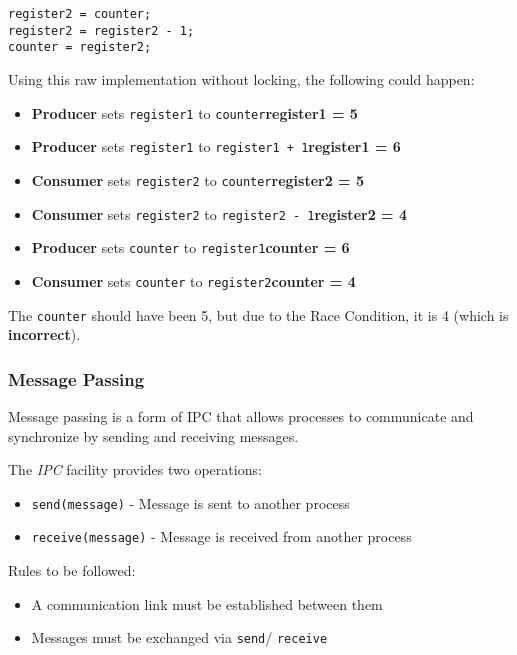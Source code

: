 \documentclass[]{article}
\begin{document}
\begin{tcolorbox}[title = Decrement]
\begin{verbatim}
register2 = counter;
register2 = register2 - 1;
counter = register2;
\end{verbatim}
\end{tcolorbox}

Using this raw implementation without locking, the following could happen:

\begin{itemize}
    \item \textbf{Producer} sets \verb|register1| to \verb|counter|\hfill \textbf{register1 = 5}
    \item \textbf{Producer} sets \verb|register1| to \verb|register1 + 1|\hfill \textbf{register1 = 6}
    \item \textbf{Consumer} sets \verb|register2| to \verb|counter|\hfill \textbf{register2 = 5}
    \item \textbf{Consumer} sets \verb|register2| to \verb|register2 - 1|\hfill \textbf{register2 = 4}
    \item \textbf{Producer} sets \verb|counter| to \verb|register1|\hfill \textbf{counter = 6}
    \item \textbf{Consumer} sets \verb|counter| to \verb|register2|\hfill \textbf{counter = 4}
\end{itemize}

The \verb|counter| should have been 5, but due to the Race Condition, it is 4 (which is \textbf{incorrect}).

\subsubsection*{Message Passing}

Message passing is a form of IPC that allows processes to communicate and synchronize by sending and receiving messages. 

The \emph{IPC} facility provides two operations:
\begin{itemize}
    \item \verb|send(message)| - Message is sent to another process
    \item \verb|receive(message)| - Message is received from another process
\end{itemize}

Rules to be followed:
\begin{itemize}
    \item A communication link must be established between them
    \item Messages must be exchanged via \verb|send|/ \verb|receive|
\end{itemize}
\end{document}
